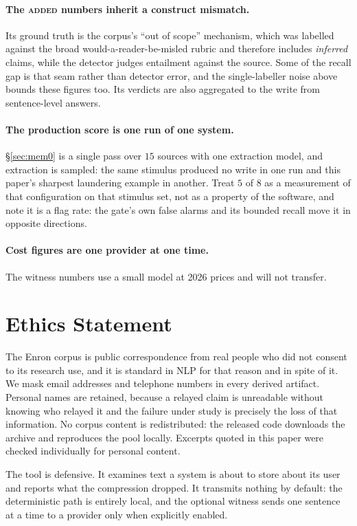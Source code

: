 \documentclass[11pt]{article}
\begin{document}
\paragraph{The \textsc{added} numbers inherit a construct mismatch.} Its ground truth is
the corpus's ``out of scope'' mechanism, which was labelled against the broad
would-a-reader-be-misled rubric and therefore includes \emph{inferred} claims, while the
detector judges entailment against the source. Some of the recall gap is that seam
rather than detector error, and the single-labeller noise above bounds these figures
too. Its verdicts are also aggregated to the write from sentence-level answers.

\paragraph{The production score is one run of one system.} \S\ref{sec:mem0} is a single
pass over $15$ sources with one extraction model, and extraction is sampled: the same
stimulus produced no write in one run and this paper's sharpest laundering example in
another. Treat $5$ of $8$ as a measurement of that configuration on that stimulus set,
not as a property of the software, and note it is a flag rate: the gate's own false
alarms and its bounded recall move it in opposite directions.

\paragraph{Cost figures are one provider at one time.} The witness numbers use a small
model at 2026 prices and will not transfer.

\section*{Ethics Statement}
The Enron corpus \citep{klimt2004enron} is public correspondence from real people who did
not consent to its research use, and it is standard in NLP for that reason and in spite of
it. We mask email addresses and telephone numbers in every derived artifact. Personal
names are retained, because a relayed claim is unreadable without knowing who relayed it
and the failure under study is precisely the loss of that information. No corpus content
is redistributed: the released code downloads the archive and reproduces the pool locally.
Excerpts quoted in this paper were checked individually for personal content.

The tool is defensive. It examines text a system is about to store about its user and
reports what the compression dropped. It transmits nothing by default: the deterministic
path is entirely local, and the optional witness sends one sentence at a time to a
provider only when explicitly enabled.
\end{document}
